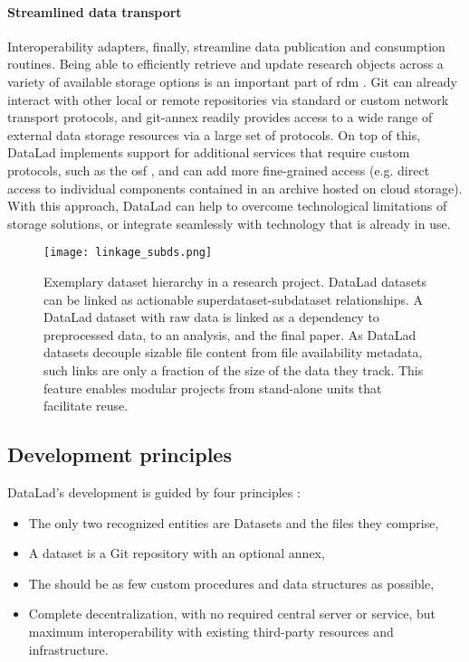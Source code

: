 {\paragraph{Streamlined data transport}
Interoperability adapters, finally, streamline data publication and consumption routines.
Being able to efficiently retrieve and update research objects across a variety of available storage options is an important part of \gls{rdm} \citep{borghi2018data}.
Git can already interact with other local or remote repositories via standard or custom network transport protocols, and git-annex readily provides access to a wide range of external data storage resources via a large set of protocols.
On top of this, DataLad implements support for additional services that require custom protocols, such as the \gls{osf} \citep{hanke2021dlosf}, and can add more fine-grained access (e.g. direct access to individual components contained in an archive hosted on cloud storage).
With this approach, DataLad can help to overcome technological limitations of storage solutions, or integrate seamlessly with technology that is already in use.

\begin{figure}
	\centering
	\texttt{[image: linkage\_subds.png]}
	\caption[DataLad dataset linkage]{Exemplary dataset hierarchy in a research project. DataLad datasets can be linked as actionable superdataset-subdataset relationships. A DataLad dataset with raw data is linked as a dependency to preprocessed data, to an analysis, and the final paper. As DataLad datasets decouple sizable file content from file availability metadata, such links are only a fraction of the size of the data they track. This feature enables modular projects from stand-alone units that facilitate reuse.}
	\label{fig:subdslinkage}
\end{figure}

\subsection{Development principles}

DataLad's development is guided by four principles \citep{Halchenko2021}:
\begin{itemize}
	\item The only two recognized entities are Datasets and the files they comprise,
	\item A dataset is a Git repository with an optional annex,
	\item The should be as few custom procedures and data structures as possible,
	\item Complete decentralization, with no required central server or service, but maximum interoperability with existing third-party resources and infrastructure.
\end{itemize}

}
